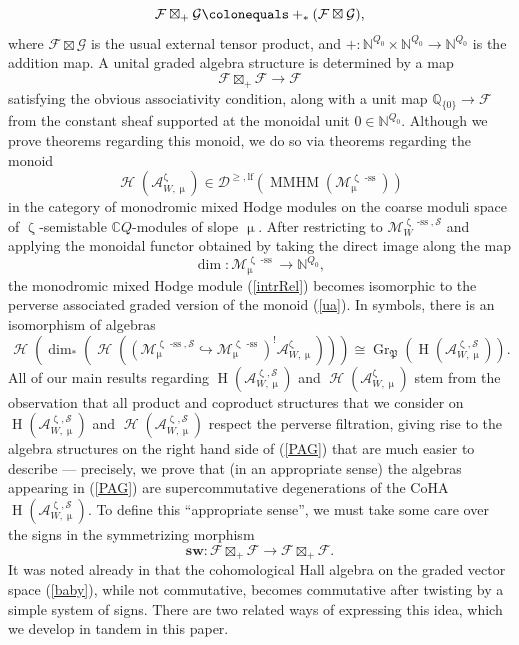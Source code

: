 \documentclass[a4paper,10pt]{amsart}
\renewcommand{\zeta}{\upzeta}
\renewcommand{\mu}{\upmu}
\DeclareMathOperator{\Pf}{\mathfrak{P}}
\newcommand{\SP}{\mathcal{S}}
\newcommand{\Msp}{\mathcal{M}}
\DeclareMathOperator{\sst}{-ss}
\DeclareMathOperator{\MMHM}{MMHM}
\DeclareMathOperator{\Gr}{Gr}
\DeclareMathOperator{\Ho}{\mathcal{H}}
\DeclareMathOperator{\HO}{H}
\newcommand{\Dulf}{\mathcal{D}^{\geq, \mathrm{lf}}}
\begin{document}
\[
\mathcal{F}\boxtimes_+\mathcal{G}\colonequals +_*(\mathcal{F}\boxtimes \mathcal{G}),
\]
where $\mathcal{F}\boxtimes\mathcal{G}$ is the usual external tensor product, and $+\colon\mathbb{N}^{Q_0}\times\mathbb{N}^{Q_0}\rightarrow \mathbb{N}^{Q_0}$ is the addition map.  A unital graded algebra structure is determined by a map
\[
\mathcal{F}\boxtimes_+\mathcal{F}\rightarrow \mathcal{F}
\]
satisfying the obvious associativity condition, along with a unit map $\mathbb{Q}_{\{0\}}\rightarrow\mathcal{F}$ from the constant sheaf supported at the monoidal unit $0\in \mathbb{N}^{Q_0}$.  Although we prove theorems regarding this monoid, we do so via theorems regarding the monoid
\begin{equation}
\label{intrRel}
\Ho(\mathcal{A}_{W,\mu}^{\zeta})\in\Dulf(\MMHM(\Msp^{\zeta\sst}_{\mu}))
\end{equation}
in the  category of monodromic mixed Hodge modules on the coarse moduli space of $\zeta$-semistable $\mathbb{C}Q$-modules of slope $\mu$.  After restricting to $\Msp^{\zeta\sst,\SP}_W$ and applying the monoidal functor obtained by taking the direct image along the map 
\[
\dim\colon \Msp_{\mu}^{\zeta\sst}\rightarrow\mathbb{N}^{Q_0},
\]
the monodromic mixed Hodge module (\ref{intrRel}) becomes isomorphic to the perverse associated graded version of the monoid (\ref{ua}).  In symbols, there is an isomorphism of algebras
\begin{equation}
\label{PAG}
\Ho\left(\dim_*\left(\Ho\left((\Msp^{\zeta\sst,\SP}_{\mu}\hookrightarrow \Msp^{\zeta\sst}_{\mu})^!\mathcal{A}_{W,\mu}^{\zeta}\right)\right)\right)\cong \Gr_{\Pf}\left(\HO(\mathcal{A}_{W,\mu}^{\zeta,\SP})\right).
\end{equation}
All of our main results regarding $\HO(\mathcal{A}_{W,\mu}^{\zeta,\SP})$ and $\Ho(\mathcal{A}_{W,\mu}^{\zeta})$ stem from the observation that all product and coproduct structures that we consider on $\HO(\mathcal{A}^{\zeta,\SP}_{W,\mu})$ and $\Ho(\mathcal{A}^{\zeta,\SP}_{W,\mu})$ respect the perverse filtration, giving rise to the algebra structures on the right hand side of (\ref{PAG}) that are much easier to describe --- precisely, we prove that (in an appropriate sense) the algebras appearing in (\ref{PAG}) are supercommutative degenerations of the CoHA $\HO(\mathcal{A}^{\zeta,\SP}_{W,\mu})$.
\smallbreak
To define this ``appropriate sense'', we must take some care over the signs in the symmetrizing morphism 
\[
\textbf{sw}:\mathcal{F}\boxtimes_+ \mathcal{F}\rightarrow \mathcal{F}\boxtimes_+\mathcal{F}.
\]
It was noted already in \cite{KS2} that the cohomological Hall algebra on the graded vector space (\ref{baby}), while not commutative, becomes commutative after twisting by a simple system of signs.  There are two related ways of expressing this idea, which we develop in tandem in this paper.  
\end{document}
